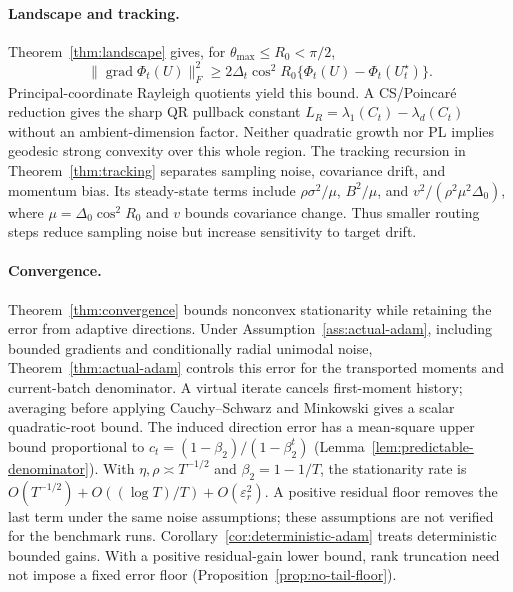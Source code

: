 \paragraph{Landscape and tracking.}
Theorem~\ref{thm:landscape} gives, for $\theta_{\max}\le R_0<\pi/2$,
\begin{equation}
\|\operatorname{grad}\Phi_t(U)\|_F^2\ge2\Delta_t\cos^2R_0\{\Phi_t(U)-\Phi_t(U_t^\star)\}.
\end{equation}
Principal-coordinate Rayleigh quotients yield this bound. A CS/Poincar\'e
reduction gives the sharp QR pullback constant
$L_R=\lambda_1(C_t)-\lambda_d(C_t)$ without an ambient-dimension factor.
Neither quadratic growth nor PL implies geodesic strong convexity over this
whole region. The tracking recursion in Theorem~\ref{thm:tracking} separates
sampling noise, covariance drift, and momentum bias. Its steady-state terms
include $\rho\sigma^2/\mu$, $B^2/\mu$, and
$v^2/(\rho^2\mu^2\Delta_0)$, where $\mu=\Delta_0\cos^2R_0$ and $v$ bounds
covariance change. Thus smaller routing steps reduce sampling noise but
increase sensitivity to target drift.

\paragraph{Convergence.}
Theorem~\ref{thm:convergence} bounds nonconvex stationarity while retaining
the error from adaptive directions. Under Assumption~\ref{ass:actual-adam},
including bounded gradients and conditionally radial unimodal noise,
Theorem~\ref{thm:actual-adam} controls this error for
the transported moments and current-batch denominator. A virtual iterate
cancels first-moment history; averaging before applying Cauchy--Schwarz and
Minkowski gives a scalar quadratic-root bound. The induced direction error
has a mean-square upper bound proportional to $c_t=(1-\beta_2)/(1-\beta_2^t)$
(Lemma~\ref{lem:predictable-denominator}). With
$\eta,\rho\asymp T^{-1/2}$ and $\beta_2=1-1/T$, the stationarity rate is
$O(T^{-1/2})+O((\log T)/T)+O(\varepsilon_r^2)$. A positive residual floor
removes the last term under the same noise assumptions; these assumptions
are not verified for the benchmark runs. Corollary~\ref{cor:deterministic-adam}
treats deterministic bounded gains. With a positive residual-gain lower bound,
rank truncation need not impose a fixed error floor
(Proposition~\ref{prop:no-tail-floor}).

